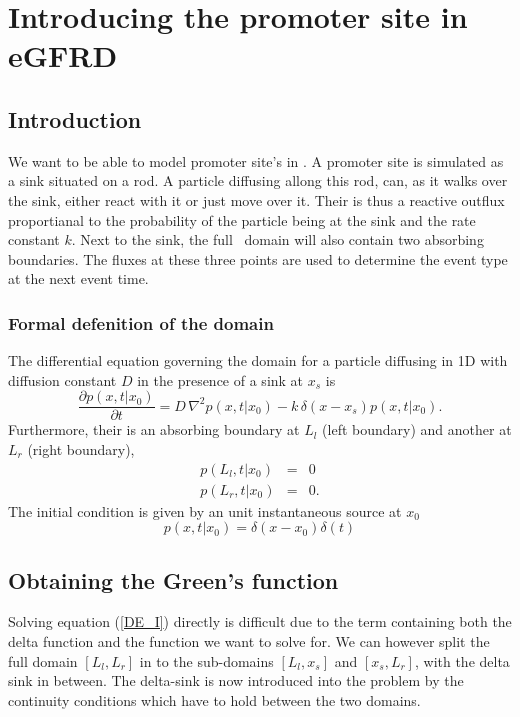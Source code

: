 \section{Introducing the promoter site in eGFRD}

\subsection{Introduction}

We want to be able to model promoter site's in \GFRD. A promoter site is simulated as a sink situated on a rod. A particle diffusing allong this rod, can, as it walks over the sink, either react with it or just move over it. Their is thus a reactive outflux proportianal to the probability of the particle being at the sink and the rate constant $k$. Next to the sink, the full \GFRD\, domain will also contain two absorbing boundaries. The fluxes at these three points are used to determine the event type at the next event time.

\subsubsection{Formal defenition of the domain}

The differential equation governing the domain for a particle diffusing in 1D with diffusion constant $D$ in the presence of a sink at $x_s$ is
\begin{equation}
 \frac{\partial p(x,t|x_0)}{\partial t} = D \, \nabla ^2 p(x,t|x_0) - k \, \delta (x - x_s) p(x,t|x_0).
 \label{DE_I}
\end{equation}
Furthermore, their is an absorbing boundary at $L_l$ (left boundary) and another at $L_r$ (right boundary),
\begin{eqnarray}
 p(L_l,t|x_0) & = & 0 \\
 p(L_r,t|x_0) & = & 0.
\label{BC_I}
\end{eqnarray}
The initial condition is given by an unit instantaneous source at $x_0$
\begin{equation}
 p(x,t|x_0) = \delta(x-x_0)\delta(t)
\label{IC_I}
\end{equation}

\subsection{Obtaining the Green's function}

Solving equation (\ref{DE_I}) directly is difficult due to the term containing both the delta function and the function we want to solve for. We can however split the full domain $[L_l,L_r]$ in to the sub-domains $[L_l,x_s]$ and $[x_s,L_r]$, with the delta sink in between. The delta-sink is now introduced into the problem by the continuity conditions which have to hold between the two domains. 

